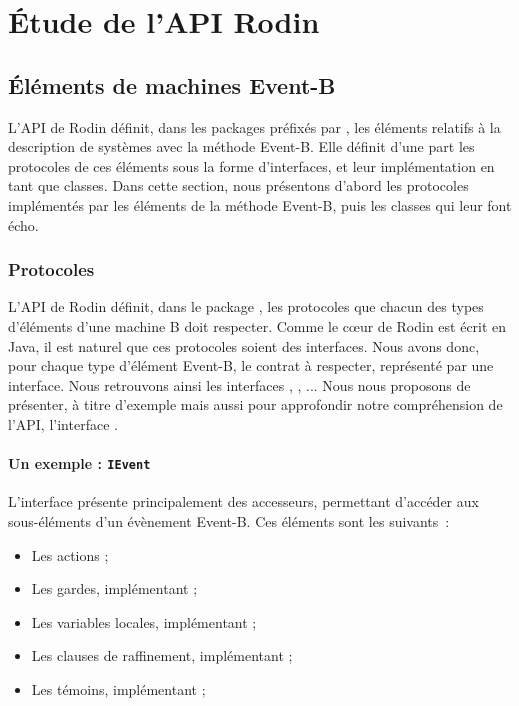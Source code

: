 \chapter{Étude de l'API Rodin}

\section{Éléments de machines Event-B}

L'API de Rodin définit, dans les packages préfixés par , les éléments relatifs à la description de systèmes %
avec la méthode Event-B.
Elle définit d'une part les protocoles de ces éléments sous la forme d'interfaces, et leur implémentation en tant que classes.
Dans cette section, nous présentons d'abord les protocoles implémentés par les éléments de la méthode Event-B, puis les classes qui leur font écho.

\subsection{Protocoles}

L'API de Rodin définit, dans le package , les protocoles que chacun des types d'éléments %
d'une machine B doit respecter.
Comme le cœur de Rodin est écrit en Java, il est naturel que ces protocoles soient des interfaces.
Nous avons donc, pour chaque type d'élément Event-B, le contrat à respecter, représenté par une interface.
Nous retrouvons ainsi les interfaces , , ...
Nous nous proposons de présenter, à titre d'exemple mais aussi pour approfondir notre compréhension de l'API, l'interface .

\subsubsection{Un exemple : \texttt{IEvent}}

L'interface  présente principalement des accesseurs, permettant d'accéder aux sous-éléments d'un évènement Event-B.
Ces éléments sont les suivants~:

\begin{itemize}
    \item Les actions ;
    \item Les gardes, implémentant ;
    \item Les variables locales, implémentant ;
    \item Les clauses de raffinement, implémentant ;
    \item Les témoins, implémentant ;
\end{itemize}


